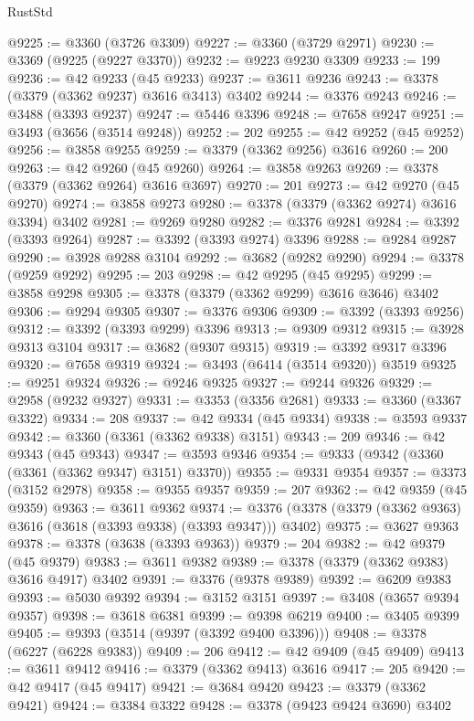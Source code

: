\begin{lexlean}{RustStd}
\begin{coremodule}
@9225 := @3360 (@3726 @3309)
@9227 := @3360 (@3729 @2971)
@9230 := @3369 (@9225 (@9227 @3370))
@9232 := @9223 @9230 @3309
@9233 := 199
@9236 := @42 @9233 (@45 @9233)
@9237 := @3611 @9236
@9243 := @3378 (@3379 (@3362 @9237) @3616 @3413) @3402
@9244 := @3376 @9243
@9246 := @3488 (@3393 @9237)
@9247 := @5446 @3396
@9248 := @7658 @9247
@9251 := @3493 (@3656 (@3514 @9248))
@9252 := 202
@9255 := @42 @9252 (@45 @9252)
@9256 := @3858 @9255
@9259 := @3379 (@3362 @9256) @3616
@9260 := 200
@9263 := @42 @9260 (@45 @9260)
@9264 := @3858 @9263
@9269 := @3378 (@3379 (@3362 @9264) @3616 @3697)
@9270 := 201
@9273 := @42 @9270 (@45 @9270)
@9274 := @3858 @9273
@9280 := @3378 (@3379 (@3362 @9274) @3616 @3394) @3402
@9281 := @9269 @9280
@9282 := @3376 @9281
@9284 := @3392 (@3393 @9264)
@9287 := @3392 (@3393 @9274) @3396
@9288 := @9284 @9287
@9290 := @3928 @9288 @3104
@9292 := @3682 (@9282 @9290)
@9294 := @3378 (@9259 @9292)
@9295 := 203
@9298 := @42 @9295 (@45 @9295)
@9299 := @3858 @9298
@9305 := @3378 (@3379 (@3362 @9299) @3616 @3646) @3402
@9306 := @9294 @9305
@9307 := @3376 @9306
@9309 := @3392 (@3393 @9256)
@9312 := @3392 (@3393 @9299) @3396
@9313 := @9309 @9312
@9315 := @3928 @9313 @3104
@9317 := @3682 (@9307 @9315)
@9319 := @3392 @9317 @3396
@9320 := @7658 @9319
@9324 := @3493 (@6414 (@3514 @9320)) @3519
@9325 := @9251 @9324
@9326 := @9246 @9325
@9327 := @9244 @9326
@9329 := @2958 (@9232 @9327)
@9331 := @3353 (@3356 @2681)
@9333 := @3360 (@3367 @3322)
@9334 := 208
@9337 := @42 @9334 (@45 @9334)
@9338 := @3593 @9337
@9342 := @3360 (@3361 (@3362 @9338) @3151)
@9343 := 209
@9346 := @42 @9343 (@45 @9343)
@9347 := @3593 @9346
@9354 := @9333 (@9342 (@3360 (@3361 (@3362 @9347) @3151) @3370))
@9355 := @9331 @9354
@9357 := @3373 (@3152 @2978)
@9358 := @9355 @9357
@9359 := 207
@9362 := @42 @9359 (@45 @9359)
@9363 := @3611 @9362
@9374 := @3376 (@3378 (@3379 (@3362 @9363) @3616 (@3618 (@3393 @9338) (@3393 @9347))) @3402)
@9375 := @3627 @9363
@9378 := @3378 (@3638 (@3393 @9363))
@9379 := 204
@9382 := @42 @9379 (@45 @9379)
@9383 := @3611 @9382
@9389 := @3378 (@3379 (@3362 @9383) @3616 @4917) @3402
@9391 := @3376 (@9378 @9389)
@9392 := @6209 @9383
@9393 := @5030 @9392
@9394 := @3152 @3151
@9397 := @3408 (@3657 @9394 @9357)
@9398 := @3618 @6381
@9399 := @9398 @6219
@9400 := @3405 @9399
@9405 := @9393 (@3514 (@9397 (@3392 @9400 @3396)))
@9408 := @3378 (@6227 (@6228 @9383))
@9409 := 206
@9412 := @42 @9409 (@45 @9409)
@9413 := @3611 @9412
@9416 := @3379 (@3362 @9413) @3616
@9417 := 205
@9420 := @42 @9417 (@45 @9417)
@9421 := @3684 @9420
@9423 := @3379 (@3362 @9421)
@9424 := @3384 @3322
@9428 := @3378 (@9423 @9424 @3690) @3402

\end{coremodule}
\end{lexlean}
